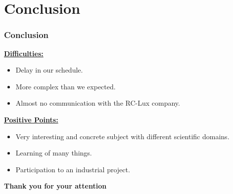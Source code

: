 \documentclass[xcolor=dvipsnames,10pt]{beamer}
\begin{document}
%
%


  \section{Conclusion}

  \begin{frame}
          \frametitle{Conclusion}
  \underline{\textbf{\color{blue}Difficulties:}}\\
   \begin{itemize}
    \item Delay in our schedule.
    \item More complex than we expected.
    \item Almost no communication with the RC-Lux company.
    \end{itemize}

  \underline{\textbf{\color{blue}Positive Points:}}\\ 
   \begin{itemize}
    \item Very interesting and concrete subject with different scientific domains.
    \item Learning of many things.
    \item Participation to an industrial project.
   \end{itemize}
  \end{frame}

  \begin{frame}
  \vspace{8mm}
  \hspace{4mm}
  \huge{\textbf{\color{blue}Thank you for your attention}}
  \end{frame}

  
\end{document}
